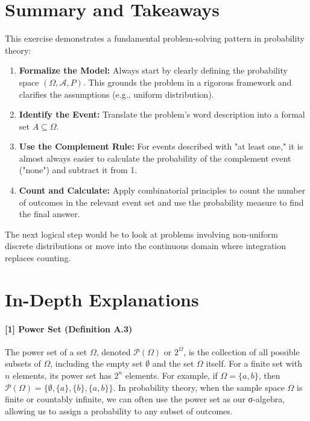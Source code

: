 \documentclass[11pt,a4paper]{article}
\begin{document}
\section{Summary and Takeaways}
This exercise demonstrates a fundamental problem-solving pattern in probability theory:
\begin{enumerate}
    \item \textbf{Formalize the Model:} Always start by clearly defining the probability space $(\Omega, \mathcal{A}, P)$. This grounds the problem in a rigorous framework and clarifies the assumptions (e.g., uniform distribution).
    \item \textbf{Identify the Event:} Translate the problem's word description into a formal set $A \subseteq \Omega$.
    \item \textbf{Use the Complement Rule:} For events described with "at least one," it is almost always easier to calculate the probability of the complement event ("none") and subtract it from 1.
    \item \textbf{Count and Calculate:} Apply combinatorial principles to count the number of outcomes in the relevant event set and use the probability measure to find the final answer.
\end{enumerate}
The next logical step would be to look at problems involving non-uniform discrete distributions or move into the continuous domain where integration replaces counting.

\newpage
\section*{In-Depth Explanations}
\hypertarget{note:powerset}{\label{note:powerset}}
\paragraph{[1] Power Set (Definition A.3)}
The power set of a set $\Omega$, denoted $\mathcal{P}(\Omega)$ or $2^\Omega$, is the collection of all possible subsets of $\Omega$, including the empty set $\emptyset$ and the set $\Omega$ itself. For a finite set with $n$ elements, its power set has $2^n$ elements. For example, if $\Omega = \{a, b\}$, then $\mathcal{P}(\Omega) = \{\emptyset, \{a\}, \{b\}, \{a, b\}\}$. In probability theory, when the sample space $\Omega$ is finite or countably infinite, we can often use the power set as our σ-algebra, allowing us to assign a probability to any subset of outcomes.

\vspace{1cm}
\hypertarget{note:laplace}{\label{note:laplace}}
\end{document}
